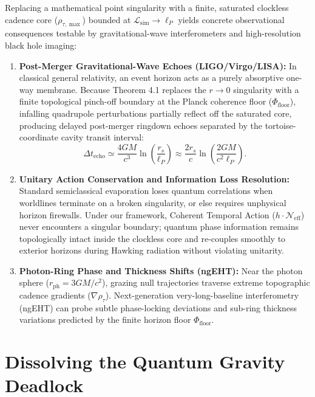 \documentclass[11pt,a4paper]{article}
\begin{document}
Replacing a mathematical point singularity with a finite, saturated clockless cadence core ($\rho_{\tau,\max}$) bounded at $\mathcal{L}_{\mathrm{sim}} \to \ell_P$ yields concrete observational consequences testable by gravitational-wave interferometers and high-resolution black hole imaging:

\begin{enumerate}
    \item \textbf{Post-Merger Gravitational-Wave Echoes (LIGO/Virgo/LISA):} In classical general relativity, an event horizon acts as a purely absorptive one-way membrane. Because Theorem 4.1 replaces the $r \to 0$ singularity with a finite topological pinch-off boundary at the Planck coherence floor ($\Phi_{\mathrm{floor}}$), infalling quadrupole perturbations partially reflect off the saturated core, producing delayed post-merger ringdown echoes separated by the tortoise-coordinate cavity transit interval:
    \begin{equation}
    \Delta t_{\mathrm{echo}} \simeq \frac{4GM}{c^3} \ln\!\left(\frac{r_s}{\ell_P}\right) \approx \frac{2r_s}{c} \ln\!\left(\frac{2GM}{c^2 \ell_P}\right).
    \end{equation}
    \item \textbf{Unitary Action Conservation and Information Loss Resolution:} Standard semiclassical evaporation loses quantum correlations when worldlines terminate on a broken singularity, or else requires unphysical horizon firewalls. Under our framework, Coherent Temporal Action ($h \cdot \mathcal{N}_{\mathrm{eff}}$) never encounters a singular boundary; quantum phase information remains topologically intact inside the clockless core and re-couples smoothly to exterior horizons during Hawking radiation without violating unitarity.
    \item \textbf{Photon-Ring Phase and Thickness Shifts (ngEHT):} Near the photon sphere ($r_{\mathrm{ph}} = 3GM/c^2$), grazing null trajectories traverse extreme topographic cadence gradients ($\nabla \rho_\tau$). Next-generation very-long-baseline interferometry (ngEHT) can probe subtle phase-locking deviations and sub-ring thickness variations predicted by the finite horizon floor $\Phi_{\mathrm{floor}}$.
\end{enumerate}

\section{Dissolving the Quantum Gravity Deadlock}
\end{document}
